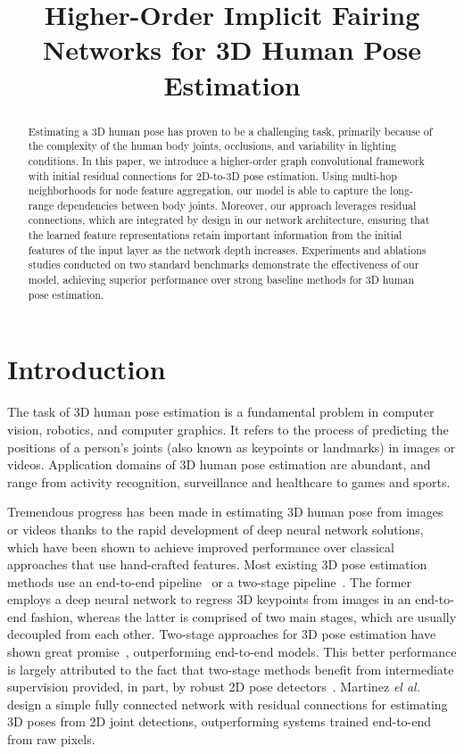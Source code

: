 \documentclass{bmvc2k}
\title{Higher-Order Implicit Fairing Networks for 3D Human Pose Estimation}
\begin{document}
\maketitle

\begin{abstract}
Estimating a 3D human pose has proven to be a challenging task, primarily because of the complexity of the human body joints, occlusions, and variability in lighting conditions. In this paper, we introduce a higher-order graph convolutional framework with initial residual connections for 2D-to-3D pose estimation. Using multi-hop neighborhoods for node feature aggregation, our model is able to capture the long-range dependencies between body joints. Moreover, our approach leverages residual connections, which are integrated by design in our network architecture, ensuring that the learned feature representations retain important information from the initial features of the input layer as the network depth increases. Experiments and ablations studies conducted on two standard benchmarks demonstrate the effectiveness of our model, achieving superior performance over strong baseline methods for 3D human pose estimation.
\end{abstract}



\section{Introduction}
The task of 3D human pose estimation is a fundamental problem in computer vision, robotics, and computer graphics. It refers to the process of predicting the positions of a person's joints (also known as keypoints or landmarks) in images or videos. Application domains of 3D human pose estimation are abundant, and range from activity recognition, surveillance and healthcare to games and sports.

Tremendous progress has been made in estimating 3D human pose from images or videos thanks to the rapid development of deep neural network solutions, which have been shown to achieve improved performance over classical approaches that use hand-crafted features. Most existing 3D pose estimation methods use an end-to-end pipeline~\cite{li20143d} or a two-stage pipeline~\cite{pavlakos2017coarse,sun2017compositional}. The former employs a deep neural network to regress 3D keypoints from images in an end-to-end fashion, whereas the latter is comprised of two main stages, which are usually decoupled from each other. Two-stage approaches for 3D pose estimation have shown great promise~\cite{zhou2017towards,martinez2017simple,yang20183d,fang2018learning,rayat2018exploiting,pavlakos2018ordinal,sharma2019monocular,ge20193d,pavllo20193d}, outperforming end-to-end models. This better performance is largely attributed to the fact that two-stage methods benefit from intermediate supervision provided, in part, by robust 2D pose detectors~\cite{pavllo20193d}. Martinez \textit{el al.}~\cite{martinez2017simple} design a simple fully connected network with residual connections for estimating 3D poses from 2D joint detections, outperforming systems trained end-to-end from raw pixels.
\end{document}
